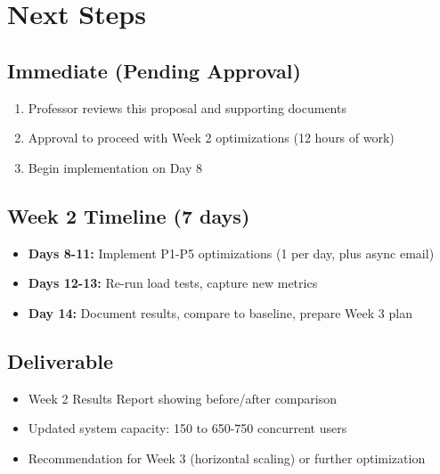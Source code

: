 \documentclass[12pt,a4paper,oneside]{report}
\begin{document}
\clearpage


\chapter{Next Steps}

\section{Immediate (Pending Approval)}

\begin{enumerate}[leftmargin=1.5em,topsep=0.3em,itemsep=0.2em]
    \item Professor reviews this proposal and supporting documents
    \item Approval to proceed with Week 2 optimizations (12 hours of work)
    \item Begin implementation on Day 8
\end{enumerate}

\section{Week 2 Timeline (7 days)}

\begin{itemize}[leftmargin=1.5em,topsep=0.3em,itemsep=0.2em]
    \item \textbf{Days 8-11:} Implement P1-P5 optimizations (1 per day, plus async email)
    \item \textbf{Days 12-13:} Re-run load tests, capture new metrics
    \item \textbf{Day 14:} Document results, compare to baseline, prepare Week 3 plan
\end{itemize}

\section{Deliverable}

\begin{itemize}[leftmargin=1.5em,topsep=0.3em,itemsep=0.2em]
    \item Week 2 Results Report showing before/after comparison
    \item Updated system capacity: 150 to 650-750 concurrent users
    \item Recommendation for Week 3 (horizontal scaling) or further optimization
\end{itemize}
\end{document}
